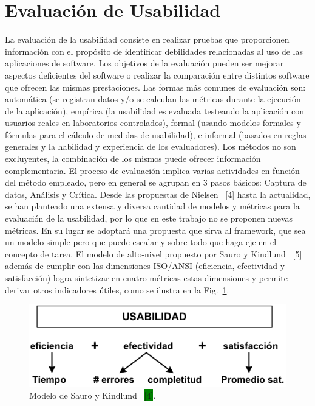 \section{Evaluación de Usabilidad}
\label{sec:eval_usabilidad}

La evaluación de la usabilidad consiste en realizar pruebas que proporcionen información con el propósito de identificar debilidades relacionadas al uso de las aplicaciones de software. Los objetivos de la evaluación pueden ser mejorar aspectos deficientes del software o realizar la comparación entre distintos software que ofrecen las mismas prestaciones. Las formas más comunes de evaluación son: automática (se registran datos y/o se calculan las métricas durante la ejecución de la aplicación), empírica (la usabilidad es evaluada testeando la aplicación con usuarios reales en laboratorios controlados), formal (usando modelos formales y fórmulas para el cálculo de medidas de usabilidad), e informal (basados en reglas generales y la habilidad y experiencia de los evaluadores). Los métodos no son excluyentes, la combinación de los mismos puede ofrecer información complementaria. El  proceso de evaluación implica varias actividades en función del método empleado, pero en general se agrupan en 3 pasos básicos: Captura de datos, Análisis y Crítica.
Desde las propuestas de Nielsen~\cite{NIELSEN1992} [4] hasta la actualidad, se han planteado una extensa y diversa cantidad de modelos y métricas para la evaluación de la usabilidad, por lo que en este trabajo no se proponen nuevas métricas. En su lugar se adoptará una propuesta que sirva al framework, que sea un modelo simple pero que puede escalar y sobre todo que haga eje en el concepto de tarea. El modelo de alto-nivel propuesto por Sauro y Kindlund~\cite{SK2005} [5] además de cumplir con las dimensiones ISO/ANSI (eficiencia, efectividad y satisfacción) logra sintetizar en cuatro métricas estas dimensiones y permite derivar otros indicadores útiles, como se ilustra en la Fig.~\ref{fig:fig1}. 

\begin{figure}[ht!]
	\centering
	\includegraphics[scale=1]{figs/fig1.png}
	\caption{\label{fig:fig1} Modelo de Sauro y Kindlund~\cite{SK2005} \colorbox{green}{[4]}.}
\end{figure}

